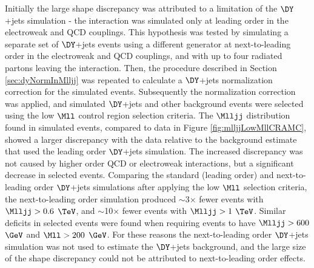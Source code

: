 Initially the large shape discrepancy was attributed to a limitation of the $\DY$+jets simulation - the \DY interaction was simulated 
only at leading order in the electroweak and QCD couplings.  This hypothesis was tested by simulating a separate set of 
$\DY$+jets events using a different \MC generator at next-to-leading order in the electroweak and QCD couplings, and with up to four 
radiated partons leaving the \DY interaction.  Then, the procedure described in Section \ref{sec:dyNormInMlljj} was repeated to 
calculate a $\DY$+jets normalization correction for the simulated events.  Subsequently the normalization correction was applied, and 
simulated $\DY$+jets and other background events were selected using the low $\Mll$ control region selection criteria.  The $\Mlljj$ 
distribution found in simulated events, compared to data in Figure \ref{fig:mlljjLowMllCRAMC}, showed a larger discrepancy with the data 
relative to the background estimate that used the leading order $\DY$+jets simulation.  The increased discrepancy was not caused by 
higher order QCD or electroweak interactions, but a significant decrease in selected events.  Comparing the standard (leading order) 
and next-to-leading order $\DY$+jets simulations after applying the low $\Mll$ selection criteria, the next-to-leading order simulation 
produced $\sim$3$\times$ fewer events with $\Mlljj > 0.6$ $\TeV$, and $\sim$10$\times$ fewer events with $\Mlljj > 1$ $\TeV$.  Similar 
deficits in selected events were found when requiring events to have $\Mlljj > 600$ $\GeV$ and $\Mll > 200$ $\GeV$.  For these reasons 
the next-to-leading order $\DY$+jets simulation was not used to estimate the $\DY$+jets background, and the large size of the shape 
discrepancy could not be attributed to next-to-leading order effects.

